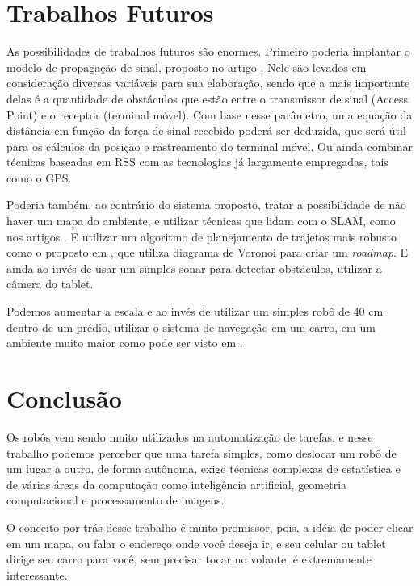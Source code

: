 \documentclass[12pt]{article}
\begin{document}
\section{Trabalhos Futuros}
    As possibilidades de trabalhos futuros são enormes. Primeiro poderia implantar o modelo de propagação
de sinal, proposto no artigo \cite{wifiRadar}. Nele são levados em consideração
diversas variáveis para sua elaboração, sendo que a mais importante delas é a quantidade de obstáculos que estão 
entre o transmissor de sinal (Access Point) e o receptor (terminal móvel).
Com base nesse parâmetro, uma equação da distância em função da força de sinal recebido
poderá ser deduzida, que será útil para os cálculos da posição e rastreamento
do terminal móvel. Ou ainda combinar técnicas baseadas em RSS com as tecnologias já largamente empregadas, tais como o GPS.
    
    
    Poderia também, ao contrário do sistema proposto, tratar a possibilidade de não haver um mapa do ambiente, e utilizar técnicas que lidam com o SLAM, 
    como nos artigos \cite{construcaoMapas2}\cite{construcaoMapas}\cite{slam}. E utilizar um algoritmo de planejamento de trajetos mais robusto 
    como o proposto em \cite{voronoi}, que utiliza diagrama de Voronoi para criar um \textit{roadmap}. E ainda ao invés de usar um simples sonar para detectar
     obstáculos, utilizar a câmera do tablet.
     
     Podemos aumentar a escala e ao invés de utilizar um simples robô de 40 cm dentro de um prédio, utilizar o sistema de navegação em um carro, 
      em um ambiente muito maior como pode ser visto em \cite{googleCar}.
\section{Conclusão}
  Os robôs vem sendo muito utilizados na automatização de tarefas, e nesse trabalho podemos perceber que  uma tarefa simples, como deslocar um robô de um lugar a outro, 
  de forma autônoma, exige técnicas complexas de estatística e de várias áreas da computação como inteligência artificial, geometria computacional e processamento de 
  imagens.
  
    O conceito por trás desse trabalho é muito promissor, pois, a idéia de poder clicar em um mapa, ou falar o endereço onde você deseja ir,
    e seu celular ou tablet dirige seu carro para você, sem precisar tocar no volante, é extremamente interessante.
	
\clearpage


\end{document}
